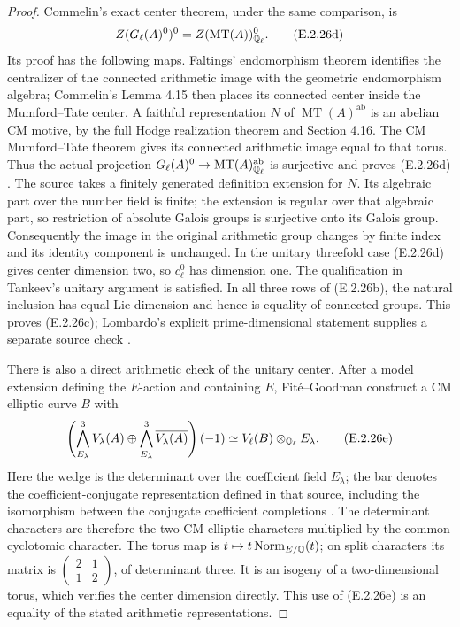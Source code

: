 \begin{proof}
Commelin's exact center theorem, under the same comparison, is
\[
 Z(G_\ell(A)^0)^0
     = Z(\operatorname{MT}(A))^0_{\mathbb Q_\ell}.
 \tag{E.2.26d}
\]
Its proof has the following maps. Faltings' endomorphism theorem
identifies the centralizer of the connected arithmetic image with
the geometric endomorphism algebra; Commelin's Lemma 4.15 then
places its connected center inside the Mumford--Tate center. A
faithful representation \(N\) of
\(\operatorname{MT}(A)^{\mathrm{ab}}\) is an abelian CM motive,
by the full Hodge realization theorem and Section 4.16. The CM
Mumford--Tate theorem gives its connected arithmetic image equal
to that torus. Thus the actual projection
\(G_\ell(A)^0\to\operatorname{MT}(A)^{\mathrm{ab}}_{\mathbb Q_\ell}\)
is surjective and proves (E.2.26d)
\cite[Theorem 4.13, Lemmas 4.15--4.18 and proof,
pp.~658--659]{GenCommelin2019}.
The source takes a finitely generated definition extension for
\(N\). Its algebraic part over the number field is finite; the
extension is regular over that algebraic part, so restriction of
absolute Galois groups is surjective onto its Galois group.
Consequently the image in the original arithmetic group changes
by finite index and its identity component is unchanged.
In the unitary threefold case (E.2.26d) gives center dimension two,
so \(c_\ell^0\) has dimension one. The qualification in Tankeev's
unitary argument is satisfied. In all three rows of (E.2.26b),
the natural inclusion has equal Lie dimension and hence is equality
of connected groups. This proves (E.2.26c); Lombardo's explicit
prime-dimensional statement supplies a separate source check
\cite[Theorem 2.18, p.~6]{GenLombardoNonsimple2015}.

There is also a direct arithmetic check of the unitary center.
After a model extension defining the \(E\)-action and containing
\(E\), Fit\'e--Goodman construct a CM elliptic curve \(B\) with
\[
 \left(\bigwedge_{E_\lambda}^3 V_\lambda(A)
       \oplus\bigwedge_{E_\lambda}^3\overline{V_\lambda(A)}\right)(-1)
       \simeq V_\ell(B)\otimes_{\mathbb Q_\ell}E_\lambda.
 \tag{E.2.26e}
\]
Here the wedge is the determinant over the coefficient field
\(E_\lambda\); the bar denotes the coefficient-conjugate
representation defined in that source, including the isomorphism
between the conjugate coefficient completions
\cite[Theorem 1.1(i), p.~2, and Theorem 3.1 with proof,
pp.~9--10]{GenFiteGoodman2026}.
The determinant characters are therefore the two CM elliptic
characters multiplied by the common cyclotomic character.
The torus map is
\(t\mapsto t\operatorname{Norm}_{E/\mathbb Q}(t)\); on split
characters its matrix is
\(\left(\begin{smallmatrix}2&1\\1&2\end{smallmatrix}\right)\),
of determinant three. It is an isogeny of a two-dimensional torus,
which verifies the center dimension directly. This use of
(E.2.26e) is an equality of the stated arithmetic representations.


\end{proof}
